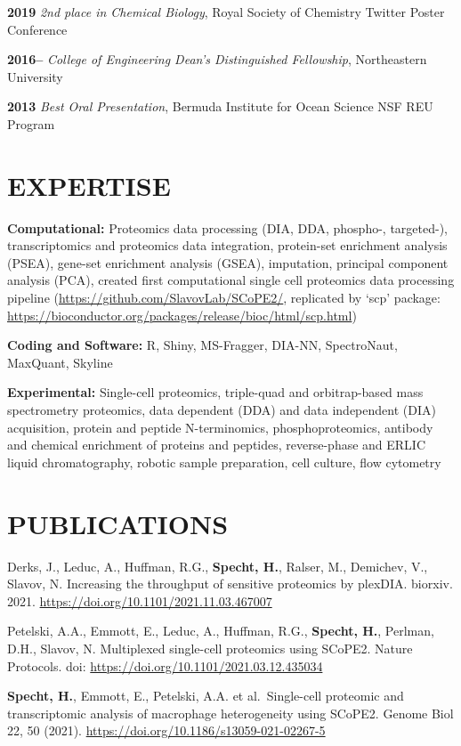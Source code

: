 \documentclass[11pt,]{article}
\begin{document}
\textbf{2019} \emph{2nd place in Chemical Biology}, Royal Society of
Chemistry Twitter Poster Conference

\textbf{2016--} \emph{College of Engineering Dean's Distinguished
Fellowship}, Northeastern University

\textbf{2013} \emph{Best Oral Presentation}, Bermuda Institute for Ocean
Science NSF REU Program

\hypertarget{expertise}{%
\section{EXPERTISE}\label{expertise}}

\textbf{Computational:} Proteomics data processing (DIA, DDA, phospho-,
targeted-), transcriptomics and proteomics data integration, protein-set
enrichment analysis (PSEA), gene-set enrichment analysis (GSEA),
imputation, principal component analysis (PCA), created first
computational single cell proteomics data processing pipeline
(\url{https://github.com/SlavovLab/SCoPE2/}, replicated by `scp'
package:
\url{https://bioconductor.org/packages/release/bioc/html/scp.html})

\textbf{Coding and Software:} R, Shiny, MS-Fragger, DIA-NN, SpectroNaut,
MaxQuant, Skyline

\textbf{Experimental:} Single-cell proteomics, triple-quad and
orbitrap-based mass spectrometry proteomics, data dependent (DDA) and
data independent (DIA) acquisition, protein and peptide N-terminomics,
phosphoproteomics, antibody and chemical enrichment of proteins and
peptides, reverse-phase and ERLIC liquid chromatography, robotic sample
preparation, cell culture, flow cytometry

\hypertarget{publications}{%
\section{PUBLICATIONS}\label{publications}}

Derks, J., Leduc, A., Huffman, R.G., \textbf{Specht, H.}, Ralser, M.,
Demichev, V., Slavov, N. Increasing the throughput of sensitive
proteomics by plexDIA. biorxiv. 2021.
\url{https://doi.org/10.1101/2021.11.03.467007}

Petelski, A.A., Emmott, E., Leduc, A., Huffman, R.G., \textbf{Specht,
H.}, Perlman, D.H., Slavov, N. Multiplexed single-cell proteomics using
SCoPE2. Nature Protocols. doi:
\url{https://doi.org/10.1101/2021.03.12.435034}

\textbf{Specht, H.}, Emmott, E., Petelski, A.A. et al.~Single-cell
proteomic and transcriptomic analysis of macrophage heterogeneity using
SCoPE2. Genome Biol 22, 50 (2021).
\url{https://doi.org/10.1186/s13059-021-02267-5}
\end{document}
